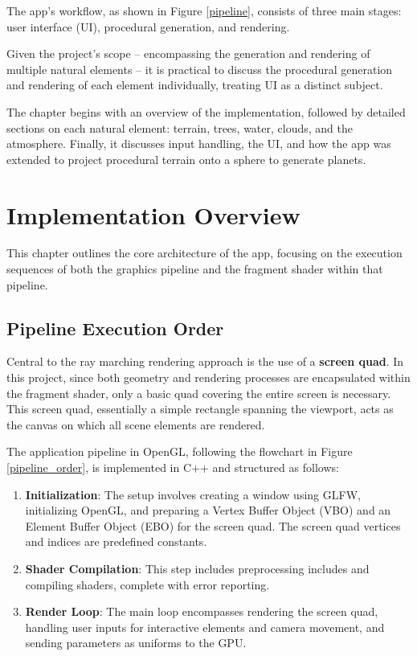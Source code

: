 \label{sec:3}

The app's workflow, as shown in Figure \ref{pipeline}, consists of three main stages: user interface (UI), procedural generation, and rendering.

Given the project's scope -- encompassing the generation and rendering of multiple natural elements -- it is practical to discuss the procedural generation and rendering of each element individually, treating UI as a distinct subject.

The chapter begins with an overview of the implementation, followed by detailed sections on each natural element: terrain, trees, water, clouds, and the atmosphere. Finally, it discusses input handling, the UI, and how the app was extended to project procedural terrain onto a sphere to generate planets.

\section{Implementation Overview}
\label{Implementation Overview}

This chapter outlines the core architecture of the app, focusing on the execution sequences of both the graphics pipeline and the fragment shader within that pipeline.

\subsection{Pipeline Execution Order}

Central to the ray marching rendering approach is the use of a \textbf{screen quad}. In this project, since both geometry and rendering processes are encapsulated within the fragment shader, only a basic quad covering the entire screen is necessary. This screen quad, essentially a simple rectangle spanning the viewport, acts as the canvas on which all scene elements are rendered.

The application pipeline in OpenGL, following the flowchart in Figure \ref{pipeline_order}, is implemented in C++ and structured as follows:
\begin{enumerate}
    \item \textbf{Initialization}: The setup involves creating a window using GLFW, initializing OpenGL, and preparing a Vertex Buffer Object (VBO) and an Element Buffer Object (EBO) for the screen quad. The screen quad vertices and indices are predefined constants.
    \item \textbf{Shader Compilation}: This step includes preprocessing includes and compiling shaders, complete with error reporting.
    \item \textbf{Render Loop}: The main loop encompasses rendering the screen quad, handling user inputs for interactive elements and camera movement, and sending parameters as uniforms to the GPU.
\end{enumerate}

